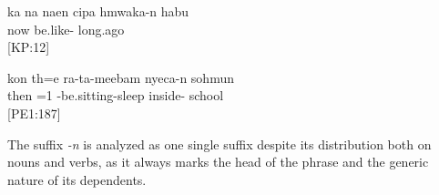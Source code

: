 \ea\label{ex:verbal-n}
\gll ka na naen cipa hmwaka-n habu\\
   now  be.like- long.ago\\
\glt \qu{But this is today, not like [things were) yesterday.} {[KP:12]}
\z


\ea\label{ex:nominal-n}
\gll kon th=e ra-ta-meebam nyeca-n sohmun\\
 then =1 -be.sitting-sleep inside- school\\
\glt {} {[PE1:187]}
\z 

%
%
%
%
%
%

The suffix \textit{-n}  is analyzed as one single suffix despite its distribution both on nouns and verbs, as it always marks the head of the phrase and the generic nature of its dependents. 


